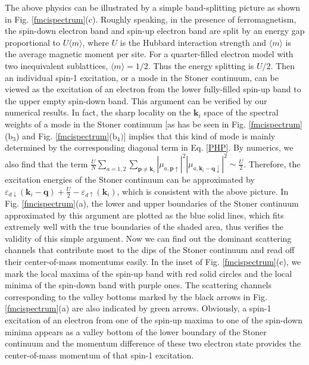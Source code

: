 \documentclass[amsmath,superscriptaddress,showpacs,aps,prb,twocolumn]{revtex4-1}
\begin{document}
\par The above physics can be illustrated by a simple band-splitting picture as shown in Fig. \ref{fmcispectrum}(c). Roughly speaking, in the presence of ferromagnetism, the spin-down electron band and spin-up electron band are split by an energy gap proportional to $U\langle m \rangle$, where $U$ is the Hubbard interaction strength and $\langle m \rangle$ is the average magnetic moment per site. For a quarter-filled electron model with two inequivalent sublattices, $\langle m \rangle=1/2$. Thus the energy splitting is $U/2$. Then an individual spin-1 excitation, or a mode in the Stoner continuum, can be viewed as the excitation of an electron from the lower fully-filled spin-up band to the upper empty spin-down band. This argument can be verified by our numerical results. In fact, the sharp locality on the $\mathbf{k}_i$ space of the spectral weights of a mode in the Stoner continuum [as has be seen in Fig. \ref{fmcispectrum}($\text{b}_3$) and Fig. \ref{fmcispectrum}($\text{b}_4)$] implies that this kind of mode is mainly determined by the corresponding diagonal term in Eq. \ref{PHP}. By numerics, we also find that the term $\frac{U}{N} \sum_{a=1,2} \sum_{\mathbf{p}\neq\mathbf{k}_i} \left| \mu_{a,\mathbf{p}\uparrow} \right|^2 \left| \mu_{a,\mathbf{k}_{i}-\mathbf{q}\downarrow} \right|^2 \sim \frac{U}{2}$. Therefore, the excitation energies of the Stoner continuum can be approximated by $\varepsilon_{d\downarrow} (\mathbf{k}_i-\mathbf{q}) + \frac{U}{2} -\varepsilon_{d\uparrow} (\mathbf{k}_i)$, which is consistent with the above picture. In Fig. \ref{fmcispectrum}(a), the lower and upper boundaries of the Stoner continuum approximated by this argument are plotted as the blue solid lines, which fits extremely well with the true boundaries of the shaded area, thus verifies the validity of this simple argument. Now we can find out the dominant scattering channels that contribute most to the dips of the Stoner continuum and read off their center-of-mass momentums easily. In the inset of Fig. \ref{fmcispectrum}(c), we mark the local maxima of the spin-up band with red solid circles and the local minima of the spin-down band with purple ones. The scattering channels corresponding to the valley bottoms marked by the black arrows in Fig. \ref{fmcispectrum}(a) are also indicated by green arrows. Obviously, a spin-1 excitation of an electron from one of the spin-up maxima to one of the spin-down minima appears as a valley bottom of the lower boundary of the Stoner continuum and the momentum difference of these two electron state provides the center-of-mass momentum of that spin-1 excitation.
\end{document}
